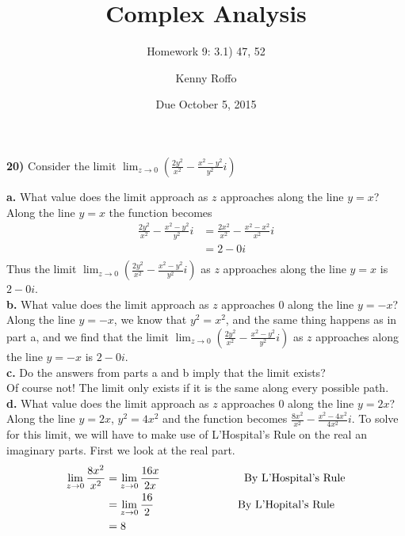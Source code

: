 \documentclass{scrartcl}
\title{Complex Analysis}
\subtitle{Homework 9: 3.1) 47, 52}
\author{Kenny Roffo}
\date{Due October 5, 2015}
\begin{document}
\maketitle

\textbf{20)} Consider the limit $\lim_{z\rightarrow0} \left(\frac{2y^2}{x^2} - \frac{x^2 - y^2}{y^2}i\right)$

\textbf{a.} What value does the limit approach as $z$ approaches along the line $y=x$?\\

  Along the line $y=x$ the function becomes 
\begin{align*}
\frac{2y^2}{x^2} - \frac{x^2 - y^2}{y^2}i &= \frac{2x^2}{x^2} - \frac{x^2 - x^2}{x^2}i\\
                                         &= 2 - 0i\\
\end{align*}
Thus the limit $\lim_{z\rightarrow0} \left(\frac{2y^2}{x^2} - \frac{x^2 - y^2}{y^2}i\right)$ as $z$ approaches along the line $y=x$ is $2-0i$.\\

\textbf{b.} What value does the limit approach as $z$ approaches 0 along the line $y=-x$?\\

  Along the line $y=-x$, we know that $y^2=x^2$, and the same thing happens as in part a, and we find that the limit $\lim_{z\rightarrow0} \left(\frac{2y^2}{x^2} - \frac{x^2 - y^2}{y^2}i\right)$ as $z$ approaches along the line $y=-x$ is $2-0i$.\\

\textbf{c.} Do the answers from parts a and b imply that the limit exists?\\

  Of course not! The limit only exists if it is the same along every possible path.\\

\textbf{d.} What value does the limit approach as $z$ approaches 0 along the line $y=2x$?\\

  Along the line $y=2x$, $y^2=4x^2$ and the function becomes $\frac{8x^2}{x^2} - \frac{x^2 - 4x^2}{4x^2}i$. To solve for this limit, we will have to make use of L'Hospital's Rule on the real an imaginary parts. First we look at the real part.
\begin{align*}
  \lim_{z\rightarrow0}\frac{8x^2}{x^2} &= \lim_{z\rightarrow0}\frac{16x}{2x} \text{\hspace{1in} By L'Hospital's Rule}\\
                                    &= \lim_{z\rightarrow0}\frac{16}{2} \text{\hspace{1in} By L'Hopital's Rule}\\
                                    &= 8
\end{align*}
\end{document}

